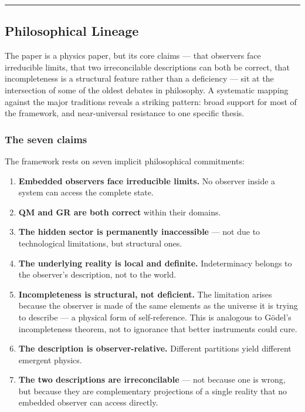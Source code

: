 \documentclass[
]{article}
\providecommand{\tightlist}{%
  \setlength{\itemsep}{0pt}\setlength{\parskip}{0pt}}
\begin{document}
\begin{center}\rule{0.5\linewidth}{0.5pt}\end{center}

\hypertarget{philosophical-lineage}{%
\subsection{Philosophical Lineage}\label{philosophical-lineage}}

The paper is a physics paper, but its core claims --- that observers
face irreducible limits, that two irreconcilable descriptions can both
be correct, that incompleteness is a structural feature rather than a
deficiency --- sit at the intersection of some of the oldest debates in
philosophy. A systematic mapping against the major traditions reveals a
striking pattern: broad support for most of the framework, and
near-universal resistance to one specific thesis.

\hypertarget{the-seven-claims}{%
\subsubsection{The seven claims}\label{the-seven-claims}}

The framework rests on seven implicit philosophical commitments:

\begin{enumerate}
\def\labelenumi{\arabic{enumi}.}
\tightlist
\item
  \textbf{Embedded observers face irreducible limits.} No observer
  inside a system can access the complete state.
\item
  \textbf{QM and GR are both correct} within their domains.
\item
  \textbf{The hidden sector is permanently inaccessible} --- not due to
  technological limitations, but structural ones.
\item
  \textbf{The underlying reality is local and definite.} Indeterminacy
  belongs to the observer's description, not to the world.
\item
  \textbf{Incompleteness is structural, not deficient.} The limitation
  arises because the observer is made of the same elements as the
  universe it is trying to describe --- a physical form of
  self-reference. This is analogous to Gödel's incompleteness theorem,
  not to ignorance that better instruments could cure.
\item
  \textbf{The description is observer-relative.} Different partitions
  yield different emergent physics.
\item
  \textbf{The two descriptions are irreconcilable} --- not because one
  is wrong, but because they are complementary projections of a single
  reality that no embedded observer can access directly.
\end{enumerate}
\end{document}
